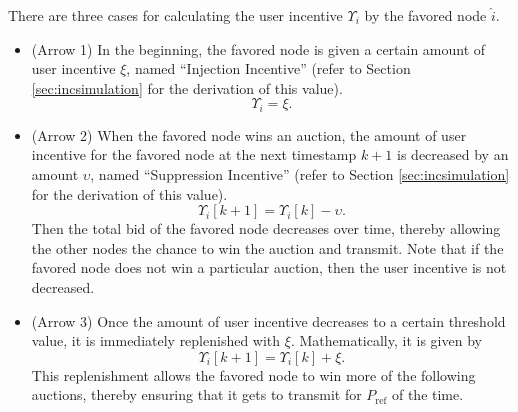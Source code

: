 \documentclass[journal]{IEEEtran}  %
\begin{document}
There are three cases for calculating the user incentive $\Upsilon_i$ by the
favored node $\hat{i}$. 
\begin{itemize}
\item (Arrow 1) In the beginning, the favored
node is given a certain amount of user incentive $\xi$, 
  named ``Injection Incentive'' (refer to Section \ref{sec:incsimulation} for
        the derivation of this value).
\begin{equation}
\Upsilon_i = \xi. 
\label{eqn:user_incentive}
\end{equation}
\item (Arrow 2) When the favored node wins an auction,  
  the amount of user incentive for the favored node at the
next timestamp $k+1$ is decreased by an amount $\upsilon$,
named ``Suppression Incentive'' (refer to Section \ref{sec:incsimulation} for
  the derivation of this value).
\begin{equation}
\Upsilon_i[k+1] = \Upsilon_i[k] - \upsilon.
\label{eqn:incentive_decrease}
\end{equation}
Then the total bid of the favored node decreases over time, thereby
allowing the other nodes the chance to win the auction and transmit.
Note that if the favored node does not win a particular auction, then the 
user incentive is not decreased.
	
\item (Arrow 3) Once the amount of user incentive decreases to a
certain threshold value, it is immediately replenished with $\xi$.
Mathematically, it is given by
\begin{equation}
\label{equation:user_injection}
\Upsilon_{i}[k+1] = \Upsilon_{i}[k] + \xi.
\end{equation}
This replenishment allows the favored node to win more of the following
auctions, thereby ensuring that it gets to transmit for $P_{\text{ref}}$ of the
time.
\end{itemize}
\end{document}
